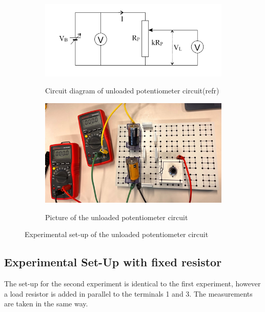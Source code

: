 \documentclass[a4paper]{article}
\begin{document}
\begin{figure}[!h]
    \centering
    \begin{subfigure}{.5\textwidth}
        \centering
        \includegraphics[width=0.8\linewidth]{Unloaded pot circuit.png}
        \label{fig:2a}
        \caption{Circuit diagram of unloaded potentiometer circuit(refr)}   
    \end{subfigure}%
    \begin{subfigure}{.5\textwidth}
        \centering
        \includegraphics[width = 0.8\linewidth]{unloaded pot picture.png}
        \label{fig2:b}
        \caption{Picture of the unloaded potentiometer circuit}
    \end{subfigure}
    \caption{Experimental set-up of the unloaded potentiometer circuit}
\end{figure}
\subsection{Experimental Set-Up with fixed resistor}
The set-up for the second experiment is identical to the first experiment,
however a load resistor is added in parallel to the terminals 1 and 3. The
measurements are taken in the same way.
\end{document}
